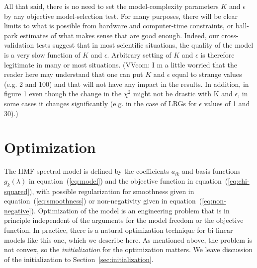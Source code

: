 \documentclass[12pt,preprint]{aastex}
\newcommand{\sectionname}{Section}
\newcommand{\equationname}{equation}
\begin{document}
All that said, there is no need to set the model-complexity parameters
$K$ and $\epsilon$ by any objective model-selection test.  For many
purposes, there will be clear limits to what is possible from hardware
and computer-time constraints, or ball-park estimates of what makes
sense that are good enough.  Indeed, our cross-validation tests
suggest that in most scientific situations, the quality of the model
is a very slow function of $K$ and $\epsilon$.  Arbitrary setting of
$K$ and $\epsilon$ is therefore legitimate in many or most situations.
(VVcom: I m a little worried that the reader here may understand that
 one can put $K$ and $\epsilon$ equal to strange values (e.g. 2 and 100) 
and that will not have any impact in the results. In addition, in figure 
1 even though the change in the $\chi^2$ might not be drastic with K and 
$\epsilon$, in some cases it changes significantly (e.g. in the case of 
LRGs for $\epsilon$ values of 1 and 30).)

\section{Optimization}\label{sec:optimization}

The HMF spectral model is defined by the coefficients $a_{ik}$ and basis
functions $g_k(\lambda)$ in \equationname~(\ref{eq:model}) and the
objective function in \equationname~(\ref{eq:chi-squared}), with possible
regularization for smoothness given in
\equationname~(\ref{eq:smoothness}) or non-negativity given in
\equationname~(\ref{eq:non-negative}).  Optimization of the model is an
engineering problem that is in principle independent of the arguments
for the model freedom or the objective function.  In practice, there
is a natural optimization technique for bi-linear models like this
one, which we describe here.  As mentioned above, the problem is not
convex, so the \emph{initialization} for the optimization matters.  We
leave discussion of the initialization to
\sectionname~\ref{sec:initialization}.
\end{document}
